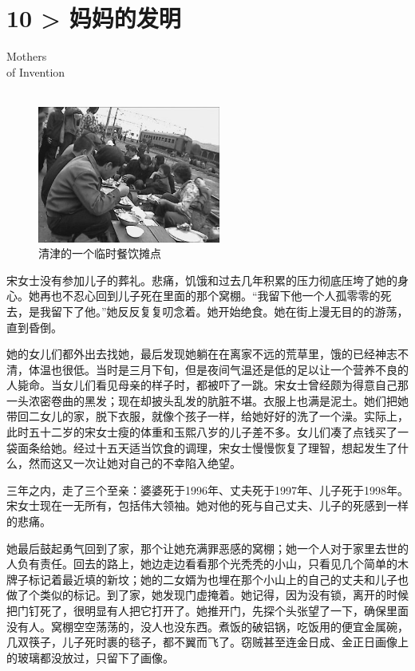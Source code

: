 \chapter*{10 > 妈妈的发明}
\vspace{15mm}
\begin{flushright}
	\textcolor{PinYinColor}{\EN \huge{Mothers\\
			of Invention\\
			\ \\}}
\end{flushright}

\begin{figure}[!htbp]
	\centering
	\includegraphics[width=6cm]{./Chapters/Images/10.jpg}
	\caption*{清津的一个临时餐饮摊点}
\end{figure}

宋女士没有参加儿子的葬礼。悲痛，饥饿和过去几年积累的压力彻底压垮了她的身心。她再也不忍心回到儿子死在里面的那个窝棚。“我留下他一个人孤零零的死去，是我留下了他。”她反反复复叨念着。她开始绝食。她在街上漫无目的的游荡，直到昏倒。

她的女儿们都外出去找她，最后发现她躺在在离家不远的荒草里，饿的已经神志不清，体温也很低。当时是三月下旬，但是夜间气温还是低的足以让一个营养不良的人毙命。当女儿们看见母亲的样子时，都被吓了一跳。宋女士曾经颇为得意自己那一头浓密卷曲的黑发；现在却披头乱发的肮脏不堪。衣服上也满是泥土。她们把她带回二女儿的家，脱下衣服，就像个孩子一样，给她好好的洗了一个澡。实际上，此时五十二岁的宋女士瘦的体重和玉熙八岁的儿子差不多。女儿们凑了点钱买了一袋面条给她。经过十五天适当饮食的调理，宋女士慢慢恢复了理智，想起发生了什么，然而这又一次让她对自己的不幸陷入绝望。

三年之内，走了三个至亲：婆婆死于1996年、丈夫死于1997年、儿子死于1998年。宋女士现在一无所有，包括伟大领袖。她对他的死与自己丈夫、儿子的死感到一样的悲痛。

她最后鼓起勇气回到了家，那个让她充满罪恶感的窝棚；她一个人对于家里去世的人负有责任。回去的路上，她边走边看看那个光秃秃的小山，只看见几个简单的木牌子标记着最近填的新坟；她的二女婿为也埋在那个小山上的自己的丈夫和儿子也做了个类似的标记。到了家，她发现门虚掩着。她记得，因为没有锁，离开的时候把门钉死了，很明显有人把它打开了。她推开门，先探个头张望了一下，确保里面没有人。窝棚空空荡荡的，没人也没东西。煮饭的破铝锅，吃饭用的便宜金属碗，几双筷子，儿子死时裹的毯子，都不翼而飞了。窃贼甚至连金日成、金正日画像上的玻璃都没放过，只留下了画像。

